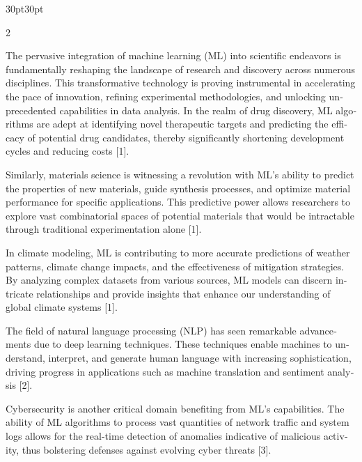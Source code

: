 \documentclass{article}
\begin{document}
\vspace{25pt}
\begin{adjustwidth}{30pt}{30pt}
\begin{multicols}{2}
\let\raggedright\relax
\justifying
\setlength{\parindent}{0pt}
\setlength{\parskip}{6pt}


\vspace{5pt}

\begin{otherlanguage}{english}
\noindent The pervasive integration of machine learning (ML) into scientific endeavors is fundamentally reshaping the landscape of research and discovery across numerous disciplines. This transformative technology is proving instrumental in accelerating the pace of innovation, refining experimental methodologies, and unlocking unprecedented capabilities in data analysis. In the realm of drug discovery, ML algorithms are adept at identifying novel therapeutic targets and predicting the efficacy of potential drug candidates, thereby significantly shortening development cycles and reducing costs [1].

Similarly, materials science is witnessing a revolution with ML's ability to predict the properties of new materials, guide synthesis processes, and optimize material performance for specific applications. This predictive power allows researchers to explore vast combinatorial spaces of potential materials that would be intractable through traditional experimentation alone [1].

In climate modeling, ML is contributing to more accurate predictions of weather patterns, climate change impacts, and the effectiveness of mitigation strategies. By analyzing complex datasets from various sources, ML models can discern intricate relationships and provide insights that enhance our understanding of global climate systems [1].

The field of natural language processing (NLP) has seen remarkable advancements due to deep learning techniques. These techniques enable machines to understand, interpret, and generate human language with increasing sophistication, driving progress in applications such as machine translation and sentiment analysis [2].

Cybersecurity is another critical domain benefiting from ML's capabilities. The ability of ML algorithms to process vast quantities of network traffic and system logs allows for the real-time detection of anomalies indicative of malicious activity, thus bolstering defenses against evolving cyber threats [3].


\end{otherlanguage}
\end{multicols}
\end{adjustwidth}
\end{document}
